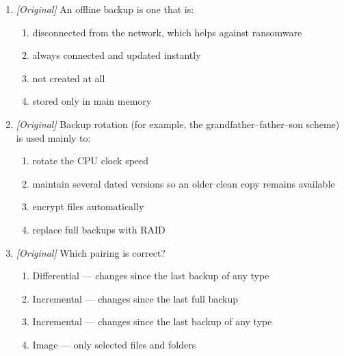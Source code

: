 \begin{enumerate}[label=\textbf{Q\arabic*.}, leftmargin=*]
\begin{enumerate}[label=\Alph*.]
    \item the same as RAID 1
    \item storing the backup only on the same local disk
    \item a synonym for an incremental backup
  \end{enumerate}
\item \textit{[Original]} An offline backup is one that is:
  \begin{enumerate}[label=\Alph*.]
    \item disconnected from the network, which helps against ransomware
    \item always connected and updated instantly
    \item not created at all
    \item stored only in main memory
  \end{enumerate}
\item \textit{[Original]} Backup rotation (for example, the
  grandfather--father--son scheme) is used mainly to:
  \begin{enumerate}[label=\Alph*.]
    \item rotate the CPU clock speed
    \item maintain several dated versions so an older clean copy remains
      available
    \item encrypt files automatically
    \item replace full backups with RAID
  \end{enumerate}
\item \textit{[Original]} Which pairing is correct?
  \begin{enumerate}[label=\Alph*.]
    \item Differential --- changes since the last backup of any type
    \item Incremental --- changes since the last full backup
    \item Incremental --- changes since the last backup of any type
    \item Image --- only selected files and folders
  \end{enumerate}


\end{enumerate}
